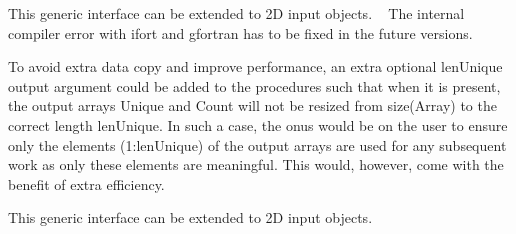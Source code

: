 \begin{DoxyRefList}
\item[Type \mbox{\hyperlink{interfaceArrayUnique__mod_1_1genUnique}{Array\+Unique\+\_\+mod\+::gen\+Unique}} ]\label{todo__todo000021}%
%
 This generic interface can be extended to 2D input objects. ~\newline
 The internal compiler error with {\ttfamily ifort} and {\ttfamily gfortran} has to be fixed in the future versions. ~\newline
 
\item[Type \mbox{\hyperlink{interfaceArrayUnique__mod_1_1getUnique}{Array\+Unique\+\_\+mod\+::get\+Unique}} ]\label{todo__todo000023}%
%
 To avoid extra data copy and improve performance, an extra optional {\ttfamily len\+Unique} output argument could be added to the procedures such that when it is present, the output arrays {\ttfamily Unique} and {\ttfamily Count} will not be resized from {\ttfamily size(\+Array)} to the correct length {\ttfamily len\+Unique}. In such a case, the onus would be on the user to ensure only the elements {\ttfamily (1\+:len\+Unique)} of the output arrays are used for any subsequent work as only these elements are meaningful. This would, however, come with the benefit of extra efficiency.

\label{todo__todo000022}%
%
 This generic interface can be extended to 2D input objects. ~\newline
 

\end{DoxyRefList}
